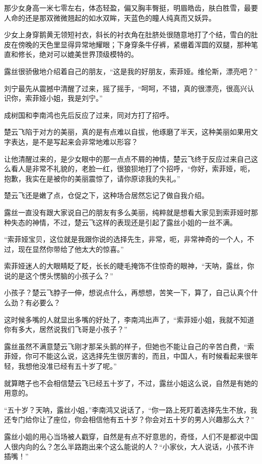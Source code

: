 那少女身高一米七零左右，体态轻盈，偏又胸丰臀挺，明眉皓齿，肤白胜雪，最要人命的还是那双微微翘起的如水双眸，天蓝色的瞳人纯真而又妖异。

少女上身穿鹅黄无领短衬衣，斜长的衬衣角在肚脐处很随意地打了个结，雪白的肚皮在傍晚的天色里显得异常地耀眼；下身穿条牛仔裤，紧绷着浑圆的双腿，那种笔直和修长，绝对可以媲美世界顶级模特的。

露丝很骄傲地介绍着自己的朋友，“这是我的好朋友，索菲娅。维伦斯，漂亮吧？”

刘宁最先从震撼中清醒了过来，摇了摇手，“呵呵，不错，真的很漂亮，很高兴认识你，索菲娅小姐，我是刘宁。”

成树国和李南鸿也先后反应了过来，同对方打了招呼。

楚云飞陷于对方的美丽，真的是有点难以自拔，他琢磨了半天，这种美丽如果用文字表达，是不是写起来会非常地难以形容？

让他清醒过来的，是少女眼中的那一点点不屑的神情，楚云飞终于反应过来自己这么看人是非常不礼貌的，老脸一红，很狼狈地打了个招呼，“你好，索菲娅，呃，抱歉，我实在是被你的美丽震惊了，请你原谅我的失礼。”

楚云飞还是嫩了点，仓促之下，这种场合居然忘记了做自我介绍。

露丝一直没有跟大家说自己的朋友有多么美丽，纯粹就是想看大家见到索菲娅时那种失态的神情，不过，楚云飞这样的表现还是引起了露丝小姐的一丝不满。

“索菲娅宝贝，这位就是我跟你说的选择先生，非常，呃，非常神奇的一个人，不过，现在显然你带给了他太大的惊喜。”

索菲娅迷人的大眼睛眨了眨，长长的睫毛掩饰不住惊奇的眼神，“天呐，露丝，你说的是这个愣头愣脑的小孩子么？”

小孩子？楚云飞脖子一伸，想说点什么，再想想，苦笑一下，算了，自己认真个什么劲？有必要么？

这时候多嘴的人就显出多嘴的好处了，李南鸿出声了，“索菲娅小姐，我就不知道你有多大，居然说我们飞哥是小孩子？”

露丝虽然不满意楚云飞刚才那呆头鹅的样子，但她也不能让自己的辛苦白费，“索菲娅，你可不能这么说，这选择先生很厉害的，而且，中国人，有时候看起来很年轻，我想他没准已经有五十岁了呢。”

就算瞎子也不会相信楚云飞已经五十岁了，不过，露丝小姐这么说，自然是有她的用意的。

“五十岁？天呐，露丝小姐，”李南鸿又说话了，“你一路上死盯着选择先生不放，我还专门给你让了座位，你会相信他有五十岁？你会对五十岁的男人兴趣那么大？”

露丝小姐的用心当场被人戳穿，自然是有点不好意思的，奇怪，人们不是都说中国人很内向的么？怎么半路跑出来个这么能说的人？“小家伙，大人说话，小孩不许插嘴！”


